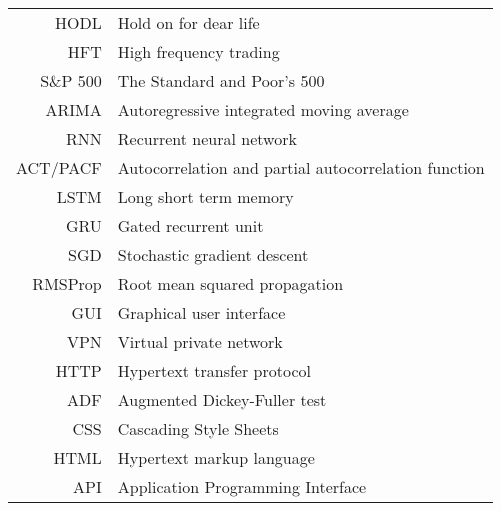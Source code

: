 \documentclass[czech,bachelor,unicode]{ctufit-thesis}
\theoremstyle{plain}
\theoremstyle{definition}
\theoremstyle{remark}
\numberwithin{theorem}{chapter}
\begin{document}
\begin{tabular}{rl}
HODL & Hold on for dear life\\
HFT & High frequency trading\\
S\&P 500 & The Standard and Poor's 500\\
ARIMA & Autoregressive integrated moving average\\
RNN & Recurrent neural network\\
ACT/PACF & Autocorrelation and partial autocorrelation function\\
LSTM & Long short term memory\\
GRU & Gated recurrent unit\\
SGD & Stochastic gradient descent\\
RMSProp & Root mean squared propagation\\
GUI & Graphical user interface\\
VPN & Virtual private network\\
HTTP & Hypertext transfer protocol\\
ADF & Augmented Dickey-Fuller test\\
CSS & Cascading Style Sheets\\
HTML & Hypertext markup language\\
API & Application Programming Interface\\
\end{tabular}

\mainmatter\mainmatterinit %



\appendix\appendixinit %


\backmatter %

\printbibliography %

\end{document}
